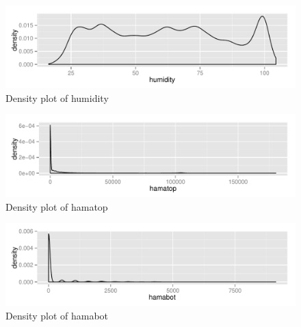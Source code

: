 \documentclass{article}\usepackage[]{graphicx}\usepackage[]{color}
\makeatletter
\def\maxwidth{ %
  \ifdim\Gin@nat@width>\linewidth
    \linewidth
  \else
    \Gin@nat@width
  \fi
}
\newenvironment{knitrout}{}{} %
\makeatother
\begin{document}
\begin{knitrout}
\color{fgcolor}\begin{figure}[h!]

{\centering \includegraphics[width=\maxwidth]{figure/addfigure5-1} 

}

\caption[Density plot of humidity]{Density plot of humidity}\label{fig:addfigure5}
\end{figure}


\end{knitrout}

\begin{knitrout}
\color{fgcolor}\begin{figure}[h!]

{\centering \includegraphics[width=\maxwidth]{figure/addfigure6-1} 

}

\caption[Density plot of hamatop]{Density plot of hamatop}\label{fig:addfigure6}
\end{figure}


\end{knitrout}

\begin{knitrout}
\color{fgcolor}\begin{figure}[h!]

{\centering \includegraphics[width=\maxwidth]{figure/addfigure7-1} 

}

\caption[Density plot of hamabot]{Density plot of hamabot}\label{fig:addfigure7}
\end{figure}


\end{knitrout}
\end{document}
